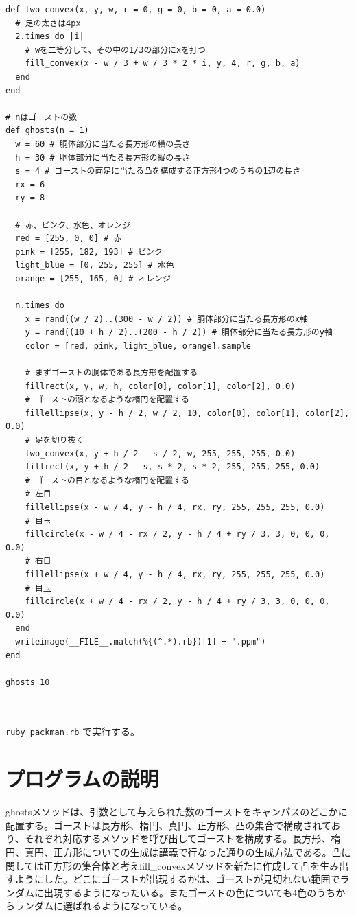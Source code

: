 \documentclass[12pt,a4j]{jarticle}
\begin{document}
\begin{verbatim}
def two_convex(x, y, w, r = 0, g = 0, b = 0, a = 0.0)
  # 足の太さは4px
  2.times do |i|
    # wを二等分して、その中の1/3の部分にxを打つ
    fill_convex(x - w / 3 + w / 3 * 2 * i, y, 4, r, g, b, a)
  end
end

# nはゴーストの数
def ghosts(n = 1)
  w = 60 # 胴体部分に当たる長方形の横の長さ
  h = 30 # 胴体部分に当たる長方形の縦の長さ
  s = 4 # ゴーストの両足に当たる凸を構成する正方形4つのうちの1辺の長さ
  rx = 6
  ry = 8

  # 赤、ピンク、水色、オレンジ
  red = [255, 0, 0] # 赤
  pink = [255, 182, 193] # ピンク
  light_blue = [0, 255, 255] # 水色
  orange = [255, 165, 0] # オレンジ

  n.times do
    x = rand((w / 2)..(300 - w / 2)) # 胴体部分に当たる長方形のx軸
    y = rand((10 + h / 2)..(200 - h / 2)) # 胴体部分に当たる長方形のy軸
    color = [red, pink, light_blue, orange].sample

    # まずゴーストの胴体である長方形を配置する
    fillrect(x, y, w, h, color[0], color[1], color[2], 0.0)
    # ゴーストの頭となるような楕円を配置する
    fillellipse(x, y - h / 2, w / 2, 10, color[0], color[1], color[2], 0.0)
    # 足を切り抜く
    two_convex(x, y + h / 2 - s / 2, w, 255, 255, 255, 0.0)
    fillrect(x, y + h / 2 - s, s * 2, s * 2, 255, 255, 255, 0.0)
    # ゴーストの目となるような楕円を配置する
    # 左目
    fillellipse(x - w / 4, y - h / 4, rx, ry, 255, 255, 255, 0.0)
    # 目玉
    fillcircle(x - w / 4 - rx / 2, y - h / 4 + ry / 3, 3, 0, 0, 0, 0.0)
    # 右目
    fillellipse(x + w / 4, y - h / 4, rx, ry, 255, 255, 255, 0.0)
    # 目玉
    fillcircle(x + w / 4 - rx / 2, y - h / 4 + ry / 3, 3, 0, 0, 0, 0.0)
  end
  writeimage(__FILE__.match(%{(^.*).rb})[1] + ".ppm")
end

ghosts 10



\end{verbatim}

\verb|ruby packman.rb| で実行する。

\section{プログラムの説明}

ghostsメソッドは、引数として与えられた数のゴーストをキャンパスのどこかに配置する。ゴーストは長方形、楕円、真円、正方形、凸の集合で構成されており、それぞれ対応するメソッドを呼び出してゴーストを構成する。長方形、楕円、真円、正方形についての生成は講義で行なった通りの生成方法である。凸に関しては正方形の集合体と考えfill_convexメソッドを新たに作成して凸を生み出すようにした。どこにゴーストが出現するかは、ゴーストが見切れない範囲でランダムに出現するようになったいる。またゴーストの色についても4色のうちからランダムに選ばれるようになっている。
\end{document}
